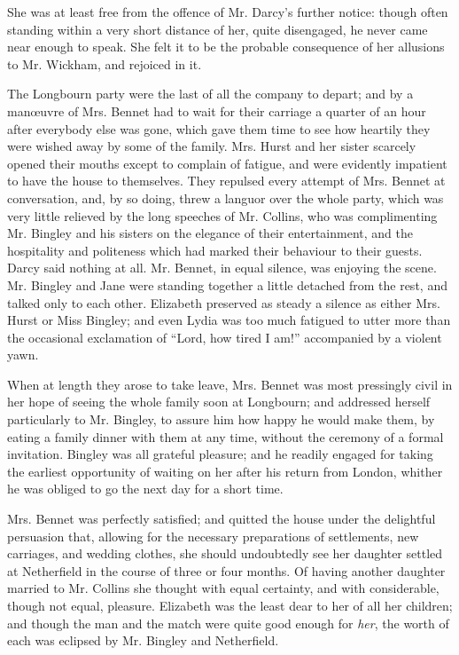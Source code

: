 \documentclass[12pt]{book}
\begin{document}
She was at least free from the offence of Mr. Darcy's further notice: though often standing within a very short distance of her, quite disengaged, he never came near enough to speak. She felt it to be the probable consequence of her allusions to Mr. Wickham, and rejoiced in it.

The Longbourn party were the last of all the company to depart; and by a manœuvre of Mrs. Bennet had to wait for their carriage a quarter of an hour after everybody else was gone, which gave them time to see how heartily they were wished away by some of the family. Mrs. Hurst and her sister scarcely opened their mouths except to complain of fatigue, and were evidently impatient to have the house to themselves. They repulsed every attempt of Mrs. Bennet at conversation, and, by so doing, threw a languor over the whole party, which was very little relieved by the long speeches of Mr. Collins, who was complimenting Mr. Bingley and his sisters on the elegance of their entertainment, and the hospitality and politeness which had marked their behaviour to their guests. Darcy said nothing at all. Mr. Bennet, in equal silence, was enjoying the scene. Mr. Bingley and Jane were standing together a little detached from the rest, and talked only to each other. Elizabeth preserved as steady a silence as either Mrs. Hurst or Miss Bingley; and even Lydia was too much fatigued to utter more than the occasional exclamation of ``Lord, how tired I am!'' accompanied by a violent yawn.

When at length they arose to take leave, Mrs. Bennet was most pressingly civil in her hope of seeing the whole family soon at Longbourn; and addressed herself particularly to Mr. Bingley, to assure him how happy he would make them, by eating a family dinner with them at any time, without the ceremony of a formal invitation. Bingley was all grateful pleasure; and he readily engaged for taking the earliest opportunity of waiting on her after his return from London, whither he was obliged to go the next day for a short time.

Mrs. Bennet was perfectly satisfied; and quitted the house under the delightful persuasion that, allowing for the necessary preparations of settlements, new carriages, and wedding clothes, she should undoubtedly see her daughter settled at Netherfield in the course of three or four months. Of having another daughter married to Mr. Collins she thought with equal certainty, and with considerable, though not equal, pleasure. Elizabeth was the least dear to her of all her children; and though the man and the match were quite good enough for \textit{her}, the worth of each was eclipsed by Mr. Bingley and Netherfield.
\end{document}
